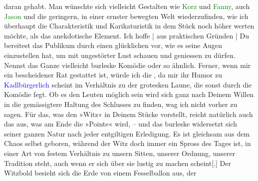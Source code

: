                daran gehabt. Man wünschte sich vielleicht Gestalten wie \textcolor{green}{Korz}{} und \textcolor{green}{Fanny}{}, auch \textcolor{green}{Jason}{} und
               die geringern, in einer ernster bewegten Welt wiederzufinden, wie ich überhaupt die
               Charakteristik und Karikaturistik in dem Stück noch höher werten möchte, als das
               anekdotische Element. Ich hoffe | aus praktischen Gründen | Du bereitest das Publikum
               durch einen glücklichen \label{K_L01721_1v}\label{K_L01721_1h}{ }\label{T_L01721_1v}\label{T_L01721_1h} vor, wie es seine Augen
               einzustellen hat, um mit ungestörter Lust schauen und geniessen zu dürfen. Nennst das
               Ganze vielleicht burleske Komödie oder so ähnlich. Ferner, wenn mir ein bescheidener
               Rat gestattet ist, würde ich die \label{K_L01721_2v}\label{K_L01721_2h}, da mir ihr Humor zu \textcolor{blue}{Kadlbürgerlich}{}\ledrightnote{\textcolor{blue}{Gustav Kadelburg}} scheint im Verhältnis zu der grotesken Laune, die sonst durch
               die Komödie fegt. Ob es den Leuten möglich sein wird sich ganz nach Deinem {\pb}Willen in die
               gemässigtere Haltung des Schlusses zu finden, wag ich nicht vorher zu sagen. Für das,
               was den »Witz« in Deinem Stücke vorstellt, reicht natürlich auch das aus, was am Ende
               die »Pointe« wird, \introOben{}–\introOben{} und das burleske widersetzt sich seiner
               ganzen Natur nach jeder entgiltigen Erledigung. Es ist gleichsam aus dem Chaos selbst
               geboren, während der Witz doch immer ein Spross des Tages ist, in einer Art von
               festem Verhältnis zu unsern Sitten, unserer Ordnung, unserer Tradition steht, auch
               wenn er sich über sie lustig zu machen scheint{[}.{]} Der Witz\introOben{}bold\introOben{} besieht sich die Erde von einem Fesselballon aus, der

